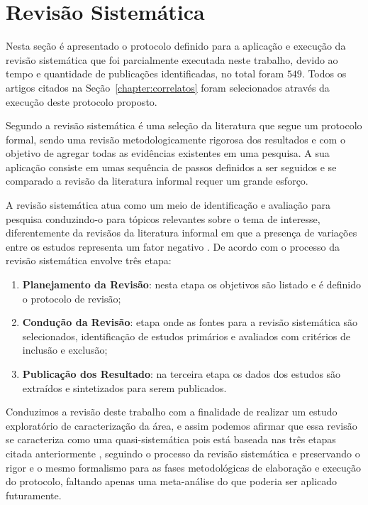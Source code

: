 \section{Revisão Sistemática}

Nesta seção é apresentado o protocolo definido para a aplicação e execução da revisão sistemática que foi parcialmente executada
neste trabalho, devido ao tempo e quantidade de publicações identificadas, no total foram $549$. Todos os artigos citados na 
Seção~\ref{chapter:correlatos} foram selecionados através da execução deste protocolo proposto.

			Segundo   a revisão sistemática é uma seleção da literatura que segue um protocolo formal, sendo uma revisão metodologicamente rigorosa dos resultados e com o objetivo de agregar todas as evidências existentes em uma pesquisa. A sua aplicação consiste em umas sequência de passos definidos a ser seguidos e se comparado a revisão da literatura informal requer um grande esforço.
			
			\par 
			A revisão sistemática atua como um meio de identificação  e avaliação para pesquisa conduzindo-o para tópicos relevantes sobre o tema de interesse, diferentemente da revisãos da literatura informal em que a presença de variações entre os estudos representa um fator negativo
			\cite{MafraTravassos}. 
			De acordo com  o processo da revisão sistemática envolve três etapa: 
			\begin{enumerate}
			    \item \textbf{Planejamento da Revisão}: nesta etapa os objetivos são listado e é definido o protocolo de revisão;
			    \item \textbf{Condução da Revisão}: etapa onde as fontes para a revisão sistemática são selecionados, identificação de estudos primários e avaliados com critérios de inclusão e exclusão;
			    \item \textbf{Publicação dos Resultado}: na terceira etapa os dados dos estudos são extraídos e sintetizados para serem publicados.
			\end{enumerate}
			
			\par 
			Conduzimos a revisão deste trabalho com a finalidade de realizar um estudo exploratório de caracterização da área, e assim podemos afirmar que essa revisão se caracteriza como uma quasi-sistemática pois está baseada nas três etapas citada anteriormente \cite{MafraTravassos}, seguindo o processo da revisão sistemática e preservando o rigor e o mesmo formalismo para as fases metodológicas de elaboração e execução do protocolo, faltando apenas uma meta-análise do que poderia ser aplicado futuramente.
			

